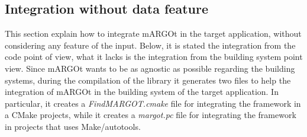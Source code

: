 \subsection{Integration without data feature}

This section explain how to integrate mARGOt in the target application, without considering any feature of the input.
Below, it is stated the integration from the code point of view, what it lacks is the integration from the building system point view.
Since mARGOt wants to be as agnostic as possible regarding the building systems, during the compilation of the library it generates two files to help the integration of mARGOt in the building system of the target application.
In particular, it creates a \textit{FindMARGOT.cmake} file for integrating the framework in a CMake projects, while it creates a \textit{margot.pc} file for integrating the framework in projects that uses Make/autotools.



